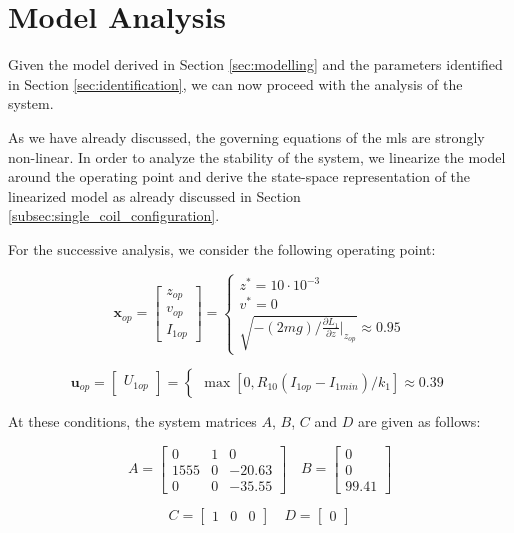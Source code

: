 \section{Model Analysis}
\label{sec:model_analysis}

Given the model derived in Section \ref{sec:modelling} and the parameters identified in Section \ref{sec:identification}, we can now proceed with the analysis of the system.

As we have already discussed, the governing equations of the \acrshort{mls} are strongly non-linear.
In order to analyze the stability of the system, we linearize the model around the operating point and derive the state-space representation of the linearized model as already discussed in Section \ref{subsec:single_coil_configuration}.

For the successive analysis, we consider the following operating point:

\begin{equation}
    \mathbf{x}_{op} =
    \begin{bmatrix}
        z_{op} \\
        v_{op} \\
        I_{1op}
    \end{bmatrix}
    =
    \begin{cases}
        z^* =  10 \cdot 10^{-3} \\
        v^* = 0                 \\
        \sqrt{ -(2m g) / \frac{\partial L_1}{\partial z} \big|_{z_{op}} } \approx 0.95
    \end{cases}
\end{equation}

\begin{equation}
    \mathbf{u}_{op} =
    \begin{bmatrix}
        U_{1op}
    \end{bmatrix}
    =
    \begin{cases}
        \max{\left[0, R_{10} \left( I_{1op} - I_{1min} \right) / k_1 \right]} \approx 0.39
    \end{cases}
\end{equation}

At these conditions, the system matrices $A$, $B$, $C$ and $D$ are given as follows:

\begin{equation}
    A =
    \begin{bmatrix}
        0    & 1 & 0      \\
        1555 & 0 & -20.63 \\
        0    & 0 & -35.55
    \end{bmatrix}
    \quad
    B =
    \begin{bmatrix}
        0 \\
        0 \\
        99.41
    \end{bmatrix}
\end{equation}

\begin{equation}
    C =
    \begin{bmatrix}
        1 & 0 & 0
    \end{bmatrix}
    \quad
    D =
    \begin{bmatrix}
        0
    \end{bmatrix}
\end{equation}



